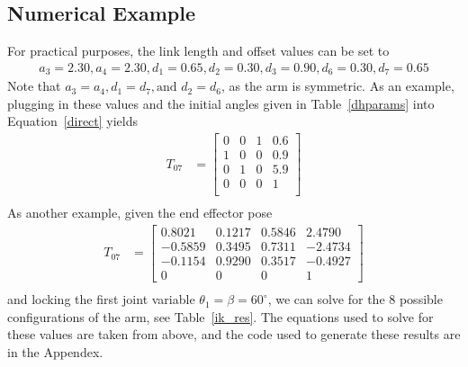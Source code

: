 \documentclass{article}
\begin{document}
\subsection{Numerical Example}
For practical purposes, the link length and offset values can be set to
\begin{align*}
a_{3} = 2.30, a_{4} = 2.30, d_{1} = 0.65, d_{2} = 0.30, d_{3} = 0.90, d_{6} = 0.30, d_{7} = 0.65
\end{align*}
Note that $a_3=a_4, d_1=d_7, \text{and } d_2=d_6$, as the arm is symmetric.
As an example, plugging in these values and the initial angles given in Table~\ref{dhparams} into Equation~\ref{direct} yields
\begin{align*}
T_{07} &=
\left[\begin{matrix}
0 & 0 & 1 & 0.6 \\
1 & 0 & 0 & 0.9 \\
0 & 1 & 0 & 5.9 \\
0 & 0 & 0 &   1 \\
\end{matrix}\right] \\
\end{align*}
As another example, given the end effector pose
\begin{align*}
T_{07} &=
\left[\begin{matrix}
0.8021 & 0.1217 & 0.5846 & 2.4790 \\
-0.5859 & 0.3495 & 0.7311 & -2.4734 \\
-0.1154 & 0.9290 & 0.3517 & -0.4927 \\
0 & 0 & 0 & 1
\end{matrix}\right] \\
\end{align*}
and locking the first joint variable $\theta_1 = \beta = 60^\circ$, we can solve for the 8 possible configurations of the arm, see Table~\ref{ik_res}.
The equations used to solve for these values are taken from above, and the code used to generate these results are in the Appendex.
\end{document}

